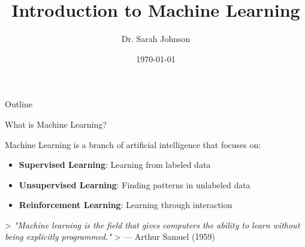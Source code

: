 \documentclass[11pt,16:9,handout]{beamer}
\title{Introduction to Machine Learning}
\author{Dr. Sarah Johnson}
\institute{Computer Science Department\\University of Technology}
\date{\today}
\begin{document}
\begin{frame}
    \titlepage
\end{frame}


\begin{frame}{Outline}
    \tableofcontents
\end{frame}



\begin{frame}{What is Machine Learning?}

            Machine Learning is a branch of artificial intelligence that focuses on:
            
\begin{itemize}
  \item \textbf{Supervised Learning}: Learning from labeled data
  \item \textbf{Unsupervised Learning}: Finding patterns in unlabeled data
  \item \textbf{Reinforcement Learning}: Learning through interaction
\end{itemize}
            
            > \textit{"Machine learning is the field that gives computers the ability to learn without being explicitly programmed."}
            > — Arthur Samuel (1959)
            

\end{frame}
\end{document}
